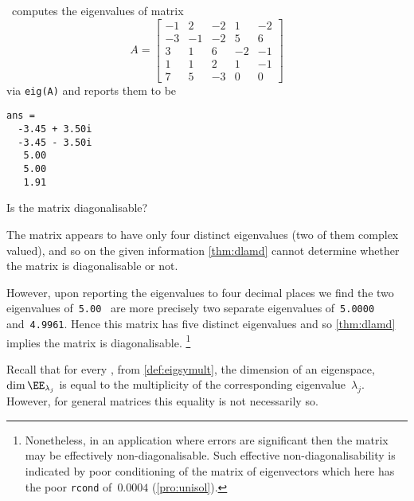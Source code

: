 \begin{example} \label{eg:}
\script\ computes the eigenvalues of matrix
\begin{equation*}
A=\begin{bmatrix}-1&2&-2&1&-2
\\-3&-1&-2&5&6
\\3&1&6&-2&-1
\\1&1&2&1&-1
\\7&5&-3&0&0 \end{bmatrix}
\end{equation*}
via \verb|eig(A)| and reports them to be \twodp
\begin{verbatim}
ans =
  -3.45 + 3.50i
  -3.45 - 3.50i
   5.00
   5.00
   1.91
\end{verbatim}
Is the matrix diagonalisable?
\begin{solution} 
The matrix appears to have only four distinct eigenvalues (two of them complex valued), and so on the given information \autoref{thm:dlamd} cannot determine whether the matrix is diagonalisable or not.

However, upon reporting the eigenvalues to four decimal places we find the two eigenvalues of~\verb|5.00| \twodp\ are more precisely two separate eigenvalues of~\verb|5.0000| and~\verb|4.9961|.
Hence this matrix has five distinct eigenvalues and so \autoref{thm:dlamd} implies the matrix is diagonalisable.
\footnote{Nonetheless, in an application where errors are significant then the matrix may be effectively non-diagonalisable.
Such effective non-diagonalisability is indicated by poor conditioning of the matrix of eigenvectors which here has the poor \texttt{rcond} of~\(0.0004\) (\autoref{pro:unisol}).}
\end{solution}
\end{example}






Recall that for every , from \autoref{def:eigsymult}, the dimension of an eigenspace,~\(\dim\EE_{\lambda_j}\) is equal to the multiplicity of the corresponding eigenvalue~\(\lambda_j\).
However, for general matrices this equality is not necessarily so.


